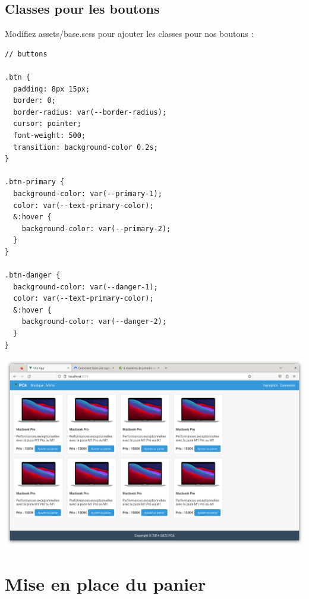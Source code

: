\subsection{Classes pour les boutons}
Modifiez {\color{monOrange}assets/base.scss} pour ajouter les classes pour nos boutons :
\begin{verbatim}
// buttons

.btn {
  padding: 8px 15px;
  border: 0;
  border-radius: var(--border-radius);
  cursor: pointer;
  font-weight: 500;
  transition: background-color 0.2s;
}

.btn-primary {
  background-color: var(--primary-1);
  color: var(--text-primary-color);
  &:hover {
    background-color: var(--primary-2);
  }
}

.btn-danger {
  background-color: var(--danger-1);
  color: var(--text-primary-color);
  &:hover {
    background-color: var(--danger-2);
  }
}
\end{verbatim}
\begin{center}
\includegraphics[width=15cm]{images/image18.png}
\end{center}


\section{Mise en place du panier}
